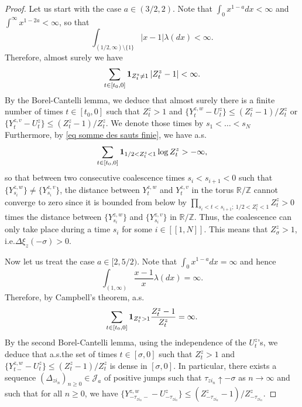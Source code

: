 \documentclass[11pt]{article}
\numberwithin{equation}{section}
\def \R{\mathbb {R}}
\def \Z{\mathbb{Z}}
\def\lb{[\![}
\def\rb{]\!]}
\begin{document}
\begin{proof}
	Let us start with the case $a \in (3/2, 2)$. Note that $\int_0 x^{1-a} dx <\infty$ and $\int^\infty x^{1-2a} <\infty$, so that 
	$$\int_{(1/2,\infty)\setminus\{1\}} \vert x-1 \vert \lambda(dx) <\infty. $$ 
	Therefore, almost surely we have 
	\begin{equation}\label{eq somme des sauts finie}
		\sum_{t \in [t_0,0]} {\bf 1}_{Z^z_t \neq 1}\left\vert {Z^{z}_t -1} \right\vert <\infty.
	\end{equation}
	By {the} Borel-Cantelli lemma, we deduce that almost surely there is a finite number of times $t\in [t_0,0]$ such that $Z^z_t>1$ and $\{Y^{z,w}_t-U^z_t\} \le (Z^z_t-1)/Z^z_t$ or $\{Y^{z,v}_t-U^z_t\} \le (Z^z_t-1)/Z^z_t$. We denote those times by $s_1< \ldots <s_N$
	Furthermore, by \eqref{eq somme des sauts finie}, we have a.s.
	$$
	\sum_{t \in [t_0, 0]} {\bf 1}_{1/2< Z^z_t <1} \log Z^z_t >- \infty,
	$$
	so that between two consecutive coalescence times $s_{i}<s_{i+1}<0$ such that $\{Y^{z,w}_{s_i}\} \neq \{Y^{z,v}_{s_i}\}$, the distance between $Y^{z,w}_t$ and $Y^{z,v}_t$ in the torus $\R/\Z$ cannot converge to zero since it is {bounded from below} by $\prod_{s_i<t<s_{i+1}; \ 1/2<Z_t^z<1}  Z^z_t>0$ times the distance between $\{Y^{z,w}_{s_i}\}$ and $\{Y^{z,v}_{s_i}\}$ in $\R/\Z$. Thus, the coalescence can only take place during a time $s_i$ for some $i \in \lb 1, N \rb$. This means that $Z^z_{\sigma} >1$, i.e.\@ $\Delta \xi_z(-\sigma) >0$.
	
	
	Now let us treat the case $a \in [2,5/2)$. Note that $\int_0 x^{1-a} dx =\infty$ and hence
	$$\int_{(1,\infty)} \frac{x-1}{x} \lambda(dx) =\infty. $$ Therefore, by Campbell's theorem, a.s.\@
	$$\sum_{t \in [t_0,0]}  {\bf 1}_{Z^{z}_t>1}\frac{Z^{z}_t -1}{Z^{z}_t} =\infty.$$
	By the second Borel-Cantelli lemma, using the independence of the $U_t^{z}$'s, we deduce that a.s.\@ the set of times $t\in [\sigma,0]$ such that $Z^z_t>1$ and $\{Y^{z,w}_{t-}-U^z_t\} \le (Z^z_t-1)/Z^z_t$ is dense in $[\sigma,0]$. In particular, there exists a sequence $(\Delta_{zi_n})_{n\ge 0}\in \mathcal{J}_a$ of positive jumps such that $\tau_{zi_n} \uparrow -\sigma$ as $n\to \infty$ and such that for all $n \ge 0$, we have $\{Y^{z,w}_{-\tau_{zi_n}-}-U^z_{-\tau_{zi_n}}\} \le (Z^z_{-\tau_{zi_n}}-1)/Z^z_{-\tau_{zi_n}}$. 
\end{proof}
\end{document}
